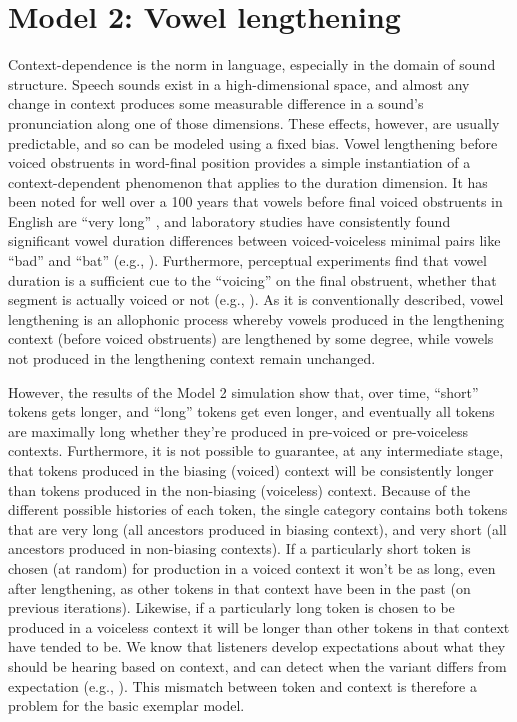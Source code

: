 \section{\label{subsec:Model-2:-Lengthening}Model 2: Vowel lengthening}

Context-dependence is the norm in language, especially in the domain
of sound structure. Speech sounds exist in a high-dimensional space,
and almost any change in context produces some measurable difference
in a sound's pronunciation along one of those dimensions. These effects,
however, are usually predictable, and so can be modeled using a fixed
bias. Vowel lengthening before voiced obstruents in word-final position
provides a simple instantiation of a context-dependent phenomenon
that applies to the duration dimension. It has been noted for well
over a 100 years that vowels before final voiced obstruents in English
are “very long” \citep[59]{Sweet1880}, and laboratory
studies have consistently found significant vowel duration differences
between voiced-voiceless minimal pairs like “bad” and “bat”
(e.g., \citealt{peterson1960duration,chen1970vowel}). Furthermore,
perceptual experiments find that vowel duration is a sufficient cue
to the “voicing” on the final obstruent, whether that segment
is actually voiced or not (e.g., \citealt{raphael1972preceding,Klatt1976}).
As it is conventionally described, vowel lengthening is an allophonic
process whereby vowels produced in the lengthening context (before
voiced obstruents) are lengthened by some degree, while vowels not
produced in the lengthening context remain unchanged.

However, the results of the Model 2 simulation show that, over time,
“short” tokens gets longer, and “long” tokens get even
longer, and eventually all tokens are maximally long whether they're
produced in pre-voiced or pre-voiceless contexts. Furthermore, it
is not possible to guarantee, at any intermediate stage, that tokens
produced in the biasing (voiced) context will be consistently longer
than tokens produced in the non-biasing (voiceless) context. Because
of the different possible histories of each token, the single category
contains both tokens that are very long (all ancestors produced in
biasing context), and very short (all ancestors produced in non-biasing
contexts). If a particularly short token is chosen (at random) for
production in a voiced context it won't be as long, even after lengthening,
as other tokens in that context have been in the past (on previous
iterations). Likewise, if a particularly long token is chosen to be
produced in a voiceless context it will be longer than other tokens
in that context have tended to be. We know that listeners develop
expectations about what they should be hearing based on context, and
can detect when the variant differs from expectation (e.g., \citealp{krakow1988coarticulatory,gaskell1996phonological}).
This mismatch between token and context is therefore a problem for
the basic exemplar model. 

